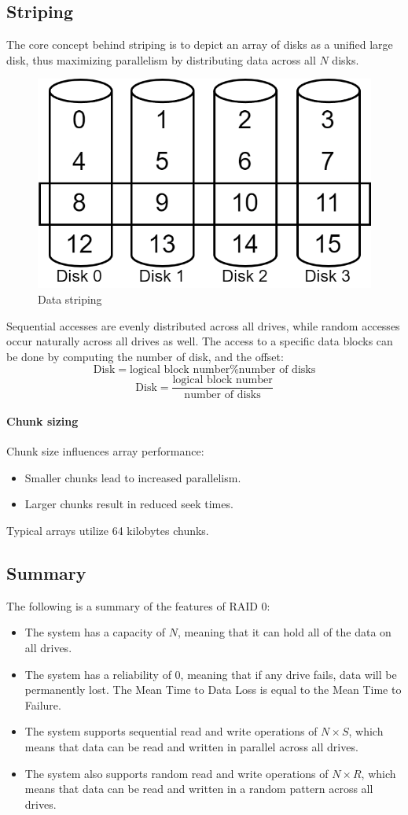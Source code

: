 \subsection{Striping}
The core concept behind striping is to depict an array of disks as a unified large disk, thus maximizing parallelism by distributing data across all $N$ disks.
\begin{figure}[H]
    \centering
    \includegraphics[width=0.4\linewidth]{images/strip.png}
    \caption{Data striping}
\end{figure}
Sequential accesses are evenly distributed across all drives, while random accesses occur naturally across all drives as well.
The access to a specific data blocks can be done by computing the number of disk, and the offset: 
\[\text{Disk}=\text{logical block number} \% \text{number of disks}\]
\[\text{Disk}=\dfrac{\text{logical block number}}{\text{number of disks}}\]

\paragraph*{Chunk sizing}
Chunk size influences array performance:
\begin{itemize}
    \item Smaller chunks lead to increased parallelism.
    \item Larger chunks result in reduced seek times.
\end{itemize}
Typical arrays utilize 64 kilobytes chunks.

\subsection{Summary}
The following is a summary of the features of RAID 0:
\begin{itemize}
\item The system has a capacity of $N$, meaning that it can hold all of the data on all drives.
\item The system has a reliability of $0$, meaning that if any drive fails, data will be permanently lost. 
    The Mean Time to Data Loss is equal to the Mean Time to Failure.
\item The system supports sequential read and write operations of $N\times S$, which means that data can be read and written in parallel across all drives.
\item The system also supports random read and write operations of $N\times R$, which means that data can be read and written in a random pattern across all drives.
\end{itemize}




